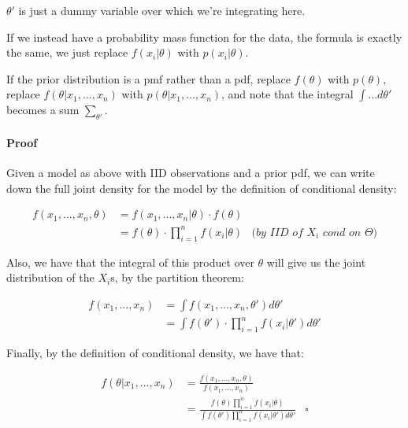 \documentclass[a4paper]{article}
\begin{document}
                $\theta'$ is just a dummy variable over which we're integrating
                here.

                If we instead have a probability mass function for the data, the
                formula is exactly the same, we just replace $f(x_i | \theta)$
                with $p(x_i | \theta)$.

                If the prior distribution is a pmf rather than a pdf, replace
                $f(\theta)$ with $p(\theta)$, replace $f(\theta | x_1, ...,
                x_n)$ with $p(\theta | x_1, ..., x_n)$, and note that the
                integral $\int ... d\theta'$ becomes a sum
                $\sum\limits_{\theta'}$.

                \paragraph{Proof}
                    Given a model as above with IID observations and a prior
                    pdf, we can write down the full joint density for the model
                    by the definition of conditional density:

                    \begin{align*}
                        f(x_1, ..., x_n, \theta) & = f(x_1, ..., x_n | \theta)
                            \cdot f(\theta) \\
                        & = f(\theta) \cdot \prod_{i=1}^n f(x_i | \theta) &
                            \textit{(by IID of $X_i$ cond on $\Theta$)}
                    \end{align*}

                    Also, we have that the integral of this product over
                    $\theta$ will give us the joint distribution of the $X_i$s,
                    by the partition theorem:

                    \begin{align*}
                        f(x_1, ..., x_n) & = \int f(x_1, ..., x_n, \theta') d
                            \theta' \\
                        & = \int f(\theta') \cdot \prod_{i=1}^n f(x_i | \theta')
                            d\theta'
                    \end{align*}

                    Finally, by the definition of conditional density, we have
                    that:

                    \begin{align*}
                        f(\theta | x_1, ..., x_n) & = \frac{f(x_1, ..., x_n,
                            \theta)}{f(x_1, ..., x_n)} \\
                        & = \frac{f(\theta) \prod\limits_{i=1}^n f(x_i |
                            \theta)}{\int f(\theta ') \prod\limits_{i=1}^n f(x_i
                            | \theta') d\theta'} & \square
                    \end{align*}
\end{document}
